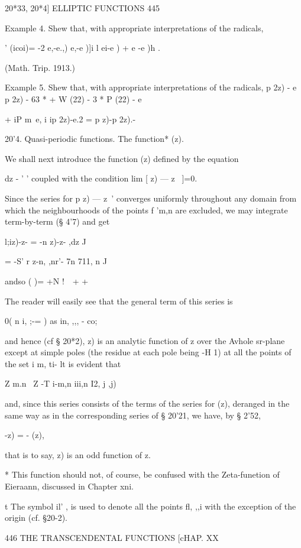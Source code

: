 {20*33, 20*4] ELLIPTIC FUNCTIONS 445 

Example 4. Shew that, with appropriate interpretations of the radicals, 

 ' (icoi)= -2   e,-e.,)  e,-e )]i  l ei-e )  +  e -e )h . 

(Math. Trip. 1913.) 

Example 5. Shew that, with appropriate interpretations of the radicals, 
 p  2z) - e     p  2z) - 63 * + W (22) -  3 *  P (22) - e    

+ iP m~e, i ip  2z)-e.2   = p z)-p  2z).- 

20'4. Quasi-periodic functions. The function*  (z). 

We shall next introduce the function  (z) defined by the equation 

dz -  '  ' 
coupled with the condition lim [  z) — z~ ]=0. 

Since the series for p  z) — z~'  converges uniformly throughout any 
domain from which the neighbourhoods of the points f  'm,n are excluded, we 
may integrate term-by-term (§ 4'7) and get 

l;iz)-z-  = -n  z)-z- ,dz 
J 

= -S' r  z-n, ,nr'- 7n%
711, n J 

andso  ( )= +N !\ \ + + 

The reader will easily see that the general term of this series is 

0( n i, ;-= ) as in, ,,, - co; 

and hence (cf § 20*2),   z) is an analytic function of z over the Avhole sr-plane 
except at simple poles (the residue at each pole being -H 1) at all the points 
of the set i m, ti- 
lt is evident that 

Z m.n \ Z -T  i-m,n  iii,n I2, j ,j) 

and, since this series consists of the terms of the series for  (z), deranged in 
the same way as in the corresponding series of § 20'21, we have, by § 2'52, 

  -z) = - (z), 

that is to say,   z) is an odd function of z. 

* This function should not, of course, be confused with the Zeta-funetion of Eieraann, 
discussed in Chapter xni. 

t The symbol il'   ,  is used to denote all the points fl, ,,i with the exception of the origin 
(cf. §20-2). 



446 THE TRANSCENDENTAL FUNCTIONS [cHAP. XX 

}
